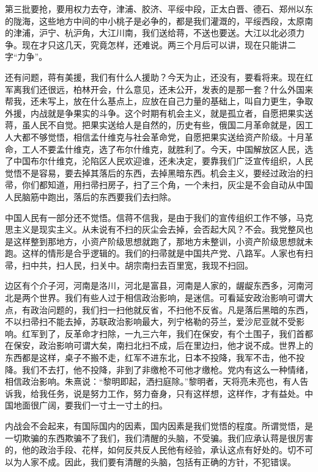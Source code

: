 第三批要抢，要用权力去夺，津浦、胶济、平绥中段，正太白晋、德石、郑州以东的陇海，这些地方中间的中小桃子是必争的，都是我们灌溉的，平绥西段，太原南的津浦，沪宁、杭沪角，大江川南，我们送给蒋，不送也要送。大江以北必须力争。现在才只这几天，究竟怎样，还难说。两三个月后可以讲，现在只能讲二字“力争”。

还有问题，蒋有美援，我们有什么人援助？今天为止，还没有，要看将来。现在红军离我们还很远，柏林开会，什么意见，还未公开，发表的是那一套？什么外国来帮我，还未写上，放在什么基点上，应放在自己力量的基础上，叫自力更生，争取外援，内战就是争果实的斗争。这个时期有机会主义，就是孤立者，自愿把果实送蒋，虽人民不自觉。把果实送给人是自然的，历史有些，俄国二月革命就是，因工人大都不够觉悟，相信孟什维克与社会革命党，自愿把果实送给资产阶级。十月革命，工人不要孟什维克，选了布尔什维克，就胜利了。今天，中国解放区人民，选了中国布尔什维克，沦陷区人民欢迎谁，还未决定，要靠我们广泛宣传组织，人民觉悟不是容易，要去掉其落后的东西，去掉黑暗东西。机会主义，要经过政治的扫帚，你们都知道，用扫帚扫房子，扫了三个角，一个未扫，灰尘是不会自动从中国人民脑筋中跑出，落后的东西要我们去扫除。

中国人民有一部分还不觉悟。信蒋不信我，是由于我们的宣传组织工作不够，马克思主义是现实主义。从未说有不扫的灰尘会去掉，会否起大风？不会。我党整风也是这样整到那地方，小资产阶级思想就跑了，那地方未整训，小资产阶级思想就未跑。这样的情形是合乎逻辑的。我们的扫帚就是中国共产党、八路军。人家也有扫帚，扫中共，扫人民，扫关中。胡宗南扫去百里宽，我现不扫回。

边区有个介子河，河南是洛川，河北是富县，河南是人家的，龌龊东西多，河南河北是两个世界。我们有些人过于相信政治影响，是迷信。可看延安政治影响可谓大点，有政治问题的，我们扫一扫他就反省，不扫他不反省。凡是落后黑暗的东西，不以扫帚扫不能去掉，苏联政治影响最大，列宁格勒的芬兰，爱沙尼亚就不受影响。红军到了，反革命才扫除，一九三六年，我们在保安，有个土围子，我们首都在保安，政治影响可谓大矣，南扫北扫不成，后在里边扫，他才说不成。世界上的东西都是这样，桌子不搬不走，红军不进东北，日本不投降，我军不击，他不投降。我们不去打，他不投降，非到了非缴枪不可他才缴枪。党内有这么一种情绪，相信政治影响。朱熹说：“黎明即起，洒扫庭除。”黎明者，天将亮未亮也，有人告诉我，给我任务，说是努力工作，努力奋身，只有这样想，这样作，才有益处。中国地面很广阔，要我们一寸土一寸土的扫。

内战会不会起来，有国际国内的因素，国内因素是我们觉悟的程度。所谓觉悟，是一切欺骗的东西欺骗不了我们，我们清醒的头脑，不受骗。我们应承认蒋是很厉害的，他的政治手段、花样，如何反共反人民他有经验，承认这点有好处的。切不可以为人家不成。因此，我们要有清醒的头脑，包括有正确的方针，不犯错误。

